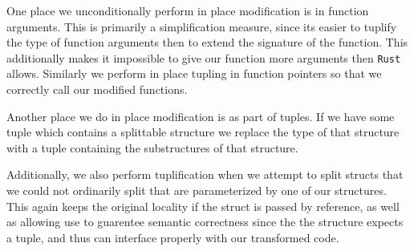 \documentclass[12pt,oneside]{book}
\newcommand{\rustname}{{\texttt{Rust}}}
\def \rust {\rustname{}\xspace}
\begin{document}
One place we unconditionally perform in place modification is in function
arguments. This is primarily a simplification measure, since its easier to
tuplify the type of function arguments then to extend the signature of the
function. This additionally makes it impossible to give our function more
arguments then \rust allows.
Similarly we perform in place tupling in function pointers so that we correctly
call our modified functions.

Another place we do in place modification is as part of tuples. If we have some
tuple which contains a splittable structure we replace the type of that
structure with a tuple containing the substructures of that structure.

Additionally, we also perform tuplification when we attempt to split
structs that we could not ordinarily split that are parameterized by
one of our structures. This again keeps the original locality if
the struct is passed by reference, as well as allowing use to guarentee
semantic correctness since the the structure expects a tuple, and thus
can interface properly with our transformed code.

  

\end{document}
